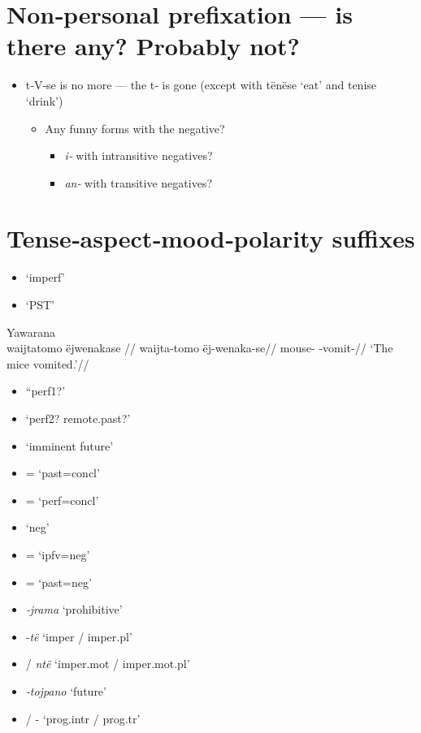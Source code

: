 \documentclass{memoir}
\begin{document}
\section{Non‑personal prefixation --- is there any? Probably not?}

\begin{itemize}
\tightlist
\item
  t‑V‑se is no more --- the t‑ is gone (except with tënëse `eat' and
  tenise `drink')

  \begin{itemize}
  \tightlist
  \item
    Any funny forms with the negative?

    \begin{itemize}
    \tightlist
    \item
      \emph{i‑} with intransitive negatives?
    \item
      \emph{an‑} with transitive negatives?
    \end{itemize}
  \end{itemize}
\end{itemize}

\section{Tense‑aspect‑mood‑polarity suffixes}

\begin{itemize}
\tightlist
\item
   `imperf'
\item
   `PST'
\end{itemize}

\ex Yawarana \\
\label{ctorat-17}\begingl
\glpreamble  waijtatomo ëjwenakase //
\gla waijta-tomo ëj-wenaka-se//
\glb mouse- -vomit-//
\glft ‘The mice vomited.’//  
\endgl 
\xe

\begin{itemize}
\tightlist
\item
   ``perf1?'
\item
   `perf2? remote.past?'
\item
   `imminent future'
\item
  = `past=concl'
\item
  = `perf=concl'
\item
   `neg'
\item
  = `ipfv=neg'
\item
  = `past=neg'
\item
  \emph{‑jrama} `prohibitive'
\item
   ‑\emph{të} `imper / imper.pl'
\item
   / \emph{ntë} `imper.mot / imper.mot.pl'
\item
  \emph{‑tojpano} `future'
\item
   / - `prog.intr / prog.tr'
\end{itemize}
\end{document}

